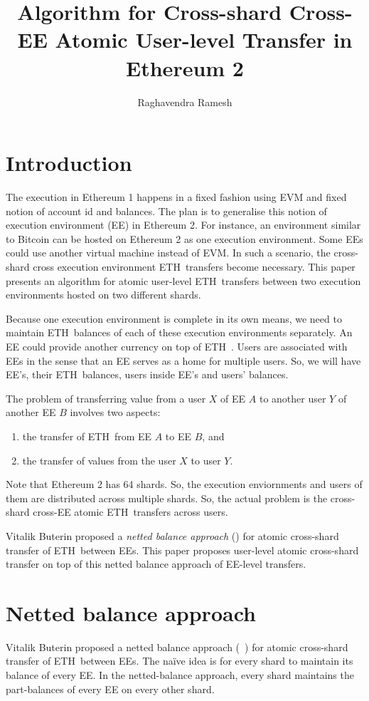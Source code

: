 \documentclass{article}
\title{Algorithm for Cross-shard Cross-EE Atomic User-level \eth Transfer in Ethereum 2}
\author{Raghavendra Ramesh}
\newcommand{\eth}[0]{ETH~}
\begin{document}
\maketitle

\section{Introduction}

The execution in Ethereum 1 happens in a fixed fashion using EVM and fixed notion of account id and balances. The plan is to generalise this notion of execution environment (EE) in Ethereum 2. For instance, an environment similar to Bitcoin can be hosted on Ethereum 2 as one execution environment.  Some EEs could use another virtual machine instead of EVM. In such a scenario, the cross-shard cross execution environment \eth transfers become necessary. This paper presents an algorithm for atomic user-level \eth transfers between two execution environments hosted on two different shards.

Because one execution environment is complete in its own means, we need to maintain \eth balances of each of these execution environments separately. An EE could provide another currency on top of \eth. Users are associated with EEs in the sense that an EE serves as a home for multiple users. So, we will have EE's, their \eth balances, users inside EE's and users' balances.

The problem of transferring value from a user $X$ of EE $A$ to another user $Y$ of another EE $B$ involves two aspects:
\begin{enumerate}
    \item the transfer of \eth from EE $A$ to EE $B$, and
    \item the transfer of values from the user $X$ to user $Y$.
\end{enumerate}
Note that Ethereum 2 has 64 shards. So, the execution enviornments and users of them are distributed across multiple shards. So, the actual problem is the cross-shard cross-EE atomic \eth transfers across users.

Vitalik Buterin proposed a {\em netted balance approach} (\cite{netted-balance}) for atomic cross-shard transfer of \eth between EEs. This paper proposes user-level atomic cross-shard transfer on top of this netted balance approach of EE-level transfers.

\section{Netted balance approach}
\label{sec:netted-balance}
Vitalik Buterin proposed a netted balance approach (~\cite{netted-balance}) for atomic cross-shard transfer of \eth between EEs. The naïve idea is for every shard to maintain its balance of every EE. In the netted-balance approach, every shard maintains the part-balances of every EE on every other shard. 
\end{document}
